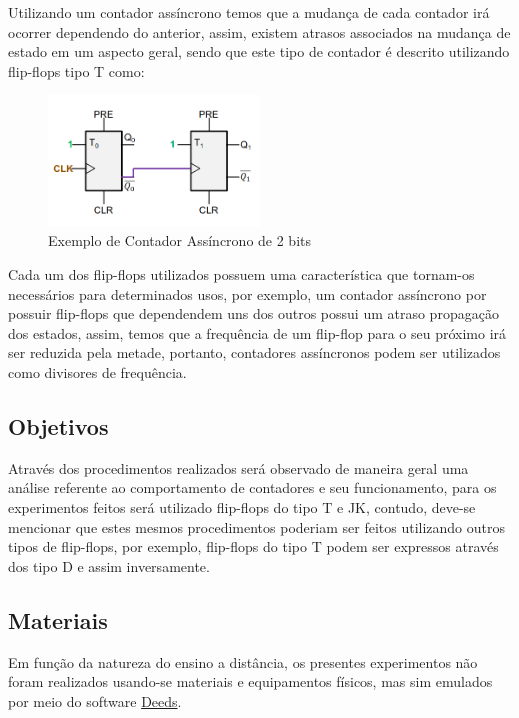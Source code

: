 \documentclass[12pt]{article}
\begin{document}
Utilizando um contador assíncrono temos que a mudança de cada contador irá
ocorrer dependendo do anterior, assim, existem atrasos associados na mudança de
estado em um aspecto geral, sendo que este tipo de contador é descrito
utilizando flip-flops tipo T como:

\begin{figure}[H]
  \centering
  \includegraphics[width=0.5\textwidth]{Exp09/images/ContadorAssincrono.png}
  \caption{Exemplo de Contador Assíncrono de 2 bits}\label{fig:ContadorAssincrono.png}
\end{figure}

Cada um dos flip-flops utilizados possuem uma característica que tornam-os
necessários para determinados usos, por exemplo, um contador assíncrono por
possuir flip-flops que dependendem uns dos outros possui um atraso propagação
dos estados, assim, temos que a frequência de um flip-flop para o seu próximo
irá ser reduzida pela metade, portanto, contadores assíncronos podem ser
utilizados como divisores de frequência.

\subsection{Objetivos}\label{sec:Objetivos}

Através dos procedimentos realizados será observado de maneira geral uma análise
referente ao comportamento de contadores e seu funcionamento, para os
experimentos feitos será utilizado flip-flops do tipo T e JK, contudo, deve-se
mencionar que estes mesmos procedimentos poderiam ser feitos utilizando outros
tipos de flip-flops, por exemplo, flip-flops do tipo T podem ser expressos
através dos tipo D e assim inversamente.

\subsection{Materiais}\label{sec:Materiais}

Em função da natureza do ensino a distância, os presentes experimentos não foram
realizados usando-se materiais e equipamentos físicos, mas sim emulados por meio
do software
\href{https://www.digitalelectronicsdeeds.com/downloads.html}{Deeds}.
\end{document}
